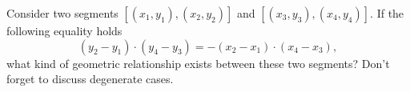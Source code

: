 Consider two segments $[(x_1,y_1), (x_2,y_2)]$ and $[(x_3,y_3),
(x_4,y_4)]$.   If the following equality holds
\[  (y_2 - y_1)\cdot(y_4  - y_3) = -(x_2 - x_1)\cdot(x_4  - x_3),\]
what kind of geometric relationship exists between these two segments?
Don't forget to discuss degenerate cases.


